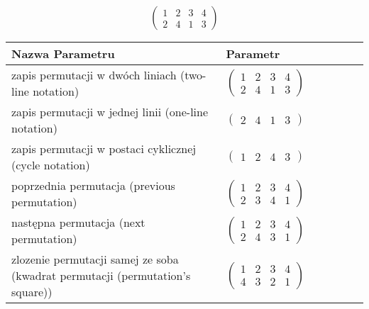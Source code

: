 \documentclass[12pt]{article}
\begin{document}
\subsection{}
\begin{center}
\[
\begin{pmatrix}
	1 & 2 & 3 & 4 \\ 
	2 & 4 & 1 & 3 
\end{pmatrix}
\]

\begin{tabular}{|m{0.6\linewidth}|m{0.4\linewidth}|}
	\hline
	Nazwa Parametru & Parametr \\
	\hline
	zapis permutacji w dwóch liniach (two-line notation) & $\begin{pmatrix} 1 & 2 & 3 & 4 \\ 
2 & 4 & 1 & 3 \end{pmatrix}$ \\ 
	\hline
	zapis permutacji w jednej linii (one-line notation) & $\begin{pmatrix} 2 & 4 & 1 & 3 \end{pmatrix}$ \\ 
	\hline
	zapis permutacji w postaci cyklicznej (cycle notation) & $\begin{pmatrix} 1 & 2 & 4 & 3 \end{pmatrix} $ \\ 
	\hline
	poprzednia permutacja (previous permutation) & $\begin{pmatrix} 1 & 2 & 3 & 4 \\ 
2 & 3 & 4 & 1 \end{pmatrix}$ \\ 
	\hline
	następna permutacja (next permutation) & $\begin{pmatrix} 1 & 2 & 3 & 4 \\ 
2 & 4 & 3 & 1 \end{pmatrix}$ \\ 
	\hline
	zlozenie permutacji samej ze soba (kwadrat permutacji (permutation's square)) & $\begin{pmatrix} 1 & 2 & 3 & 4 \\ 
4 & 3 & 2 & 1 \end{pmatrix}$ \\ 
	\hline
\end{tabular}
\end{center}
\end{document}
